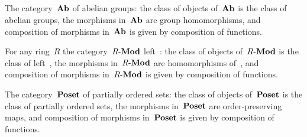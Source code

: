 \subsection{}

The category~$\mathbf{Ab}$ of abelian groups:
the class of objects of~$\mathbf{Ab}$ is the class of abelian groups, the morphisms in~$\mathbf{Ab}$ are group homomorphisms, and composition of morphisms in~$\mathbf{Ab}$ is given by composition of functions.

For any ring~$R$ the category~$R\text{-}\mathbf{Mod}$ left~:
the class of objects of~$R\text{-}\mathbf{Mod}$ is the class of left~, the morphisms in~$R\text{-}\mathbf{Mod}$ are homomorphisms of~, and composition of morphisms in~$R\text{-}\mathbf{Mod}$ is given by composition of functions.

The category~$\mathbf{Poset}$ of partially ordered sets:
the class of objects of~$\mathbf{Poset}$ is the class of partially ordered sets, the morphisms in~$\mathbf{Poset}$ are order-preserving maps, and composition of morphisms in~$\mathbf{Poset}$ is given by composition of functions.
